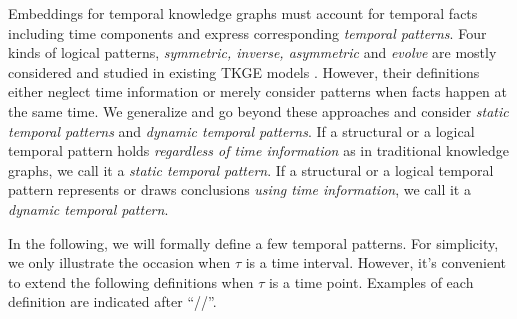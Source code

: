 \documentclass[letterpaper]{article} %
\begin{document}
Embeddings for temporal knowledge graphs must account for temporal facts including time components and express corresponding \emph{temporal patterns}. 
Four kinds of logical patterns, \emph{symmetric, inverse, asymmetric} and \emph{evolve} are mostly considered and studied in existing TKGE models \cite{chen2022rotateqvs,xu2020tero}. 
However, their definitions either neglect time information or merely consider patterns when facts happen at the same time. 
We generalize and go beyond these approaches and consider \emph{static temporal patterns} and \emph{dynamic temporal patterns}. If a structural or a logical temporal pattern holds \emph{regardless of time information} as in traditional knowledge graphs, we call it a \emph{static temporal pattern}. 
If a structural or a logical temporal pattern represents or draws conclusions \emph{using time information}, we call it a \emph{dynamic temporal pattern}.

In the following, we will formally define a few temporal patterns. For simplicity, we only illustrate the occasion when $\tau$ is a time interval. However, it's convenient to extend the following definitions when $\tau$ is a time point. Examples of each definition are indicated after ``//''.
\end{document}
